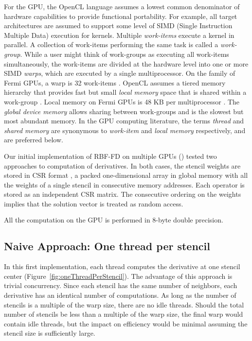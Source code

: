 \documentclass{report}
\begin{document}
For the GPU, the OpenCL language \cite{OpenCL2009} assumes a lowest common denominator of hardware capabilities to provide functional portability. For example, all target architectures are assumed to support some level of SIMD (Single Instruction Multiple Data) execution for kernels. Multiple \textit{work-items} execute a kernel in parallel. 
A collection of work-items performing the same task is called a \textit{work-group}. While a user might think of work-groups as executing all work-items simultaneously, the work-items are divided at the hardware level into one or more SIMD \textit{warps}, which are executed by a single multiprocessor. On the family of Fermi GPUs, a warp is 32 work-items \cite{CudaGuide2011}. 
OpenCL assumes a tiered memory hierarchy that provides fast but small \textit{local memory} space that is shared within a work-group \cite{OpenCL2009}. Local memory on Fermi GPUs is 48 KB per multiprocessor \cite{CudaGuide2011}. The \textit{global device memory} allows sharing between work-groups and is the slowest but most abundant memory. 
In the GPU computing literature, the terms \textit{thread} and \textit{shared memory} are synonymous to \textit{work-item} and \textit{local memory} respectively, and are preferred below. 
 
Our initial implementation of RBF-FD on multiple GPUs (\cite{BolligFlyerErlebacher2012}) tested two approaches to computation of derivatives. 
In both cases, the stencil weights are stored in CSR format \cite{Bell2009}, 
a packed one-dimensional array in global memory with all the weights 
of a single stencil in consecutive memory addresses. Each operator is stored as an independent CSR matrix. The consecutive ordering on the weights implies that the solution vector %
is treated as random access. 

All the computation on the GPU is performed in 8-byte double precision. 




\subsection{Naive Approach: One thread per stencil}

In this first implementation, each thread computes 
the derivative at one stencil center  (Figure~\ref{fig:oneThreadPerStencil}). 
The advantage of this approach is trivial concurrency.  Since each stencil has the same number of neighbors, each derivative has an identical number of computations. As long as the number of stencils is a multiple of the warp size, there are no idle threads. Should the total number of stencils be less than a multiple of the warp size, the final warp would contain idle threads, but the impact on efficiency would be minimal assuming the stencil size is sufficiently large. 
\end{document}
